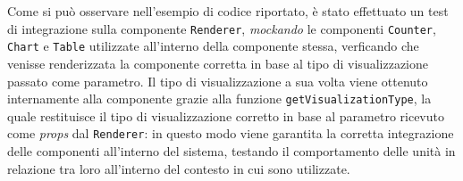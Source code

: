 Come si può osservare nell'esempio di codice riportato, è stato effettuato un test di integrazione sulla componente \texttt{Renderer},
\textit{mockando} le componenti \texttt{Counter}, \texttt{Chart} e \texttt{Table} utilizzate all'interno della componente stessa, verficando che venisse renderizzata
la componente corretta in base al tipo di visualizzazione passato come parametro. \newline
Il tipo di visualizzazione a sua volta viene ottenuto internamente alla componente grazie alla funzione \texttt{getVisualizationType}, la quale restituisce il tipo di visualizzazione
corretto in base al parametro ricevuto come \textit{props} dal \texttt{Renderer}: in questo modo viene garantita la corretta integrazione delle componenti all'interno del sistema, testando il comportamento
delle unità in relazione tra loro all'interno del contesto in cui sono utilizzate.